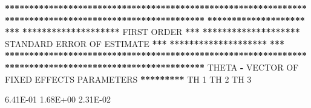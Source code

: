 \documentclass[
  11pt,
  krantz2,
  a4paper]{krantz}
\newenvironment{Shaded}{\begin{snugshade}}{\end{snugshade}}
\newcommand{\DecValTok}[1]{\textcolor[rgb]{0.00,0.00,0.81}{#1}}
\newcommand{\ErrorTok}[1]{\textcolor[rgb]{0.64,0.00,0.00}{\textbf{#1}}}
\newcommand{\FloatTok}[1]{\textcolor[rgb]{0.00,0.00,0.81}{#1}}
\newcommand{\NormalTok}[1]{#1}
\newcommand{\OperatorTok}[1]{\textcolor[rgb]{0.81,0.36,0.00}{\textbf{#1}}}
\newcommand{\StringTok}[1]{\textcolor[rgb]{0.31,0.60,0.02}{#1}}
\theoremstyle{definition}
\theoremstyle{definition}
\theoremstyle{definition}
\theoremstyle{remark}
\begin{document}
\begin{Shaded}
\begin{Highlighting}[]
\OperatorTok{**}\ErrorTok{*****************************************************************************************************}
\ErrorTok{********************}\StringTok{                                                                                }\ErrorTok{***}
\ErrorTok{********************}\StringTok{                                   }\NormalTok{FIRST ORDER                                  }\OperatorTok{**}\ErrorTok{*}
\ErrorTok{********************}\StringTok{                            }\NormalTok{STANDARD ERROR OF ESTIMATE                          }\OperatorTok{**}\ErrorTok{*}
\ErrorTok{********************}\StringTok{                                                                                }\ErrorTok{***}
\ErrorTok{*******************************************************************************************************}
\StringTok{                                                                                                       }
\StringTok{                                                                                                       }
\StringTok{                                                                                                       }
\NormalTok{THETA }\OperatorTok{{-}}\StringTok{ }\NormalTok{VECTOR OF FIXED EFFECTS PARAMETERS   }\OperatorTok{**}\ErrorTok{*******}\StringTok{                                                 }
\StringTok{                                                                                                       }
\StringTok{                                                                                                       }
\StringTok{        }\NormalTok{TH }\DecValTok{1}\NormalTok{      TH }\DecValTok{2}\NormalTok{      TH }\DecValTok{3}                                                                       
                                                                                                       
        \FloatTok{6.41E{-}01}  \FloatTok{1.68E+00}  \FloatTok{2.31E{-}02}                                                                   
                                                                                                       
                                                                                                       
                                                                                                       

\end{Highlighting}
\end{Shaded}
\end{document}
